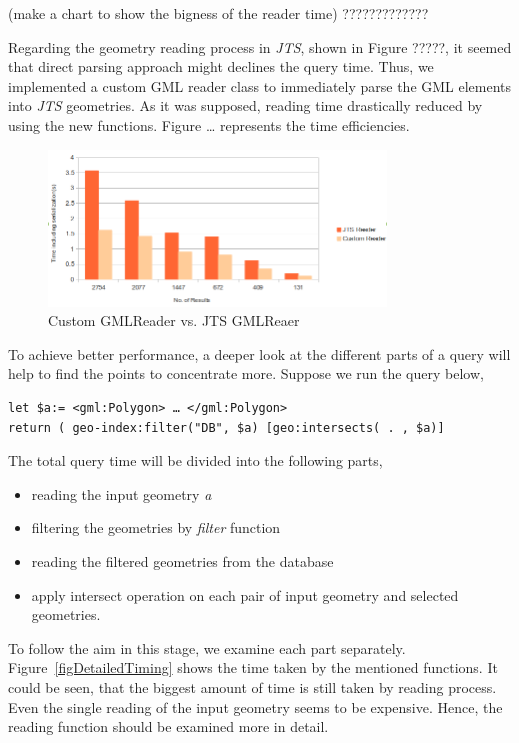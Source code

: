 \documentclass[a4paper,12pt]{article}
\begin{document}
(make a chart to show the bigness of the reader time) ?????????????

Regarding the geometry reading process in \textit{JTS}, shown in Figure ?????, it seemed that direct parsing approach might declines the query time. Thus, we implemented a custom GML reader class to immediately parse the GML elements into \textit{JTS} geometries. As it was supposed, reading time drastically reduced by using the new functions. Figure … represents the time efficiencies.

\begin{figure}
\centering
\includegraphics[width=0.8\textwidth]{GmlReader}
\caption{Custom GMLReader vs. JTS GMLReaer}
\label{figGmlReader}
\end{figure}


To achieve better performance, a deeper look at the different parts of a query will help to find the points to concentrate more. Suppose we run the query below,

\begin{verbatim}
let $a:= <gml:Polygon> … </gml:Polygon>
return ( geo-index:filter("DB", $a) [geo:intersects( . , $a)]
\end{verbatim}

The total query time will be divided into the following parts,

\begin{itemize}
\item reading the input geometry \textit{a}
\item filtering the geometries by \textit{filter} function 
\item reading the filtered geometries from the database
\item apply intersect operation on each pair of input geometry and selected geometries.
\end{itemize}

To follow the aim in this stage, we examine each part separately. Figure~\ref{figDetailedTiming} shows the time taken by the mentioned functions. It could be seen, that the biggest amount of time is still taken by reading process. Even the single reading of the input geometry seems to be expensive. Hence, the reading function should be examined more in detail.
\end{document}
